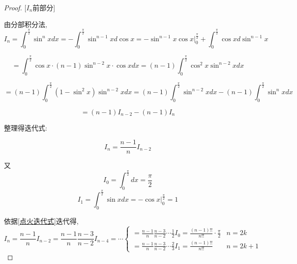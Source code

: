 \begin{proof}
    
    [$I_n$前部分]
    
    由分部积分法,
    \begin{equation*}
        I_n=\int_{0}^{\frac{\pi}{2}} \sin^n xdx
        =-\int_{0}^{\frac{\pi}{2}} \sin^{n-1}x d \cos x
        =-\sin^{n-1} x \cos x|_{0}^{\frac{\pi}{2}}+\int_{0}^{\frac{\pi}{2}} \cos x d \sin^{n-1} x
    \end{equation*}

    \begin{equation*}
        =\int_{0}^{\frac{\pi}{2}} \cos x\cdot (n-1)\sin^{n-2} x \cdot \cos x dx
        =(n-1)\int_{0}^{\frac{\pi}{2}} \cos^2 x \sin^{n-2} x dx
    \end{equation*}

    \begin{equation*}
        =(n-1)\int_{0}^{\frac{\pi}{2}} (1-\sin^2 x) \sin^{n-2} x dx
        =(n-1)\int_{0}^{\frac{\pi}{2}}\sin^{n-2} xdx - (n-1)\int_{0}^{\frac{\pi}{2}}\sin^n xdx
    \end{equation*}

    \begin{equation*}
        = (n-1)I_{n-2}-(n-1)I_n
    \end{equation*}

    整理得迭代式:

    \begin{equation}
        I_n = \frac{n-1}{n} I_{n-2} \label{点火迭代式}
    \end{equation}
    
    又
    \begin{equation*}
        I_0 = \int_{0}^{\frac{\pi}{2}} dx = \frac{\pi}{2}
    \end{equation*}
    \begin{equation*}
        I_1 = \int_{0}^{\frac{\pi}{2}} \sin x dx = -\cos x|_{0}^{\frac{\pi}{2}} = 1 
    \end{equation*}

    依据\ref{点火迭代式}迭代得,\
    \begin{equation}
        I_n = \frac{n-1}{n} I_{n-2}
        = \frac{n-1}{n} \frac{n-3}{n-2} I_{n-4}=\cdots 
        \begin{cases}
            = \frac{n-1}{n} \frac{n-3}{n-2} \cdots \frac{1}{2}I_0 = \frac{(n-1)!!}{n!!} \cdot \frac{\pi}{2}& n=2k\\
            = \frac{n-1}{n} \frac{n-3}{n-2} \cdots \frac{2}{3}I_1 = \frac{(n-1)!!}{n!!} & n=2k+1
        \end{cases}
    \end{equation}
    

\end{proof}
